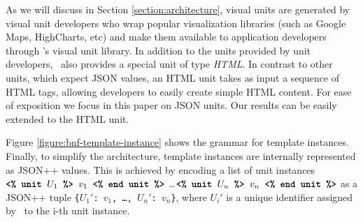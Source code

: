 As we will discuss in Section \ref{section:architecture}, visual units are generated by visual unit developers who wrap popular visualization libraries (such as Google Maps, HighCharts, etc) and make them available to application developers through \projname's visual unit library. In addition to the units provided by unit developers, \projname\ also provides a special unit of type \emph{HTML}. In contrast to other units, which expect JSON values, an HTML unit takes as input a sequence of HTML tags, allowing developers to easily create simple HTML content. For ease of exposition we focus in this paper on JSON units. Our results can be easily extended to the HTML unit. 


Figure \ref{figure:bnf-template-instance} shows the grammar for template instances. Finally, to simplify the architecture, template instances are internally represented as JSON++ values. This is achieved by encoding a list of unit instances $\texttt{\textbf{<\% unit }} U_1 \texttt{\textbf{ \%> }} v_1 \texttt{\textbf{ <\% end unit \%>}}$ \ldots $\texttt{\textbf{<\% unit }} U_n \texttt{\textbf{ \%> }} v_n \texttt{\textbf{ <\% end unit \%>}}$ as a JSON++ tuple \texttt{\{$U_1'$: $v_1$, \ldots, $U_n'$: $v_n$\}}, where $U_i'$ is a unique identifier assigned by \projname\ to the i-th unit instance. 

 


